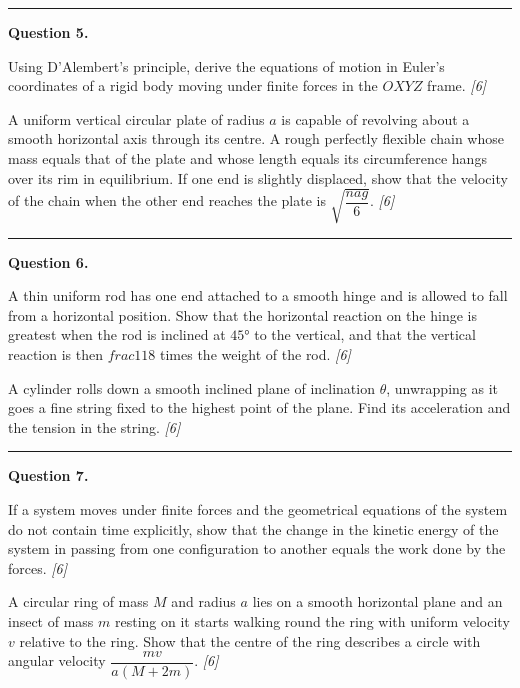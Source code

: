 \documentclass[11pt,a4paper]{article}
\newcommand{\pts}[1]{\hfill   \textit{[#1]}}
\begin{document}
\medskip\rule{\linewidth}{0.2pt}

\medskip


\noindent   \textbf{Question 5.}

\begin{parts}
  \item Using D'Alembert's principle, derive the equations of motion in Euler's coordinates of a rigid body moving under finite forces in the $OXYZ$ frame. \pts{6}
  \item A uniform vertical circular plate of radius $a$ is capable of revolving about a smooth horizontal axis through its centre. A rough perfectly flexible chain whose mass equals that of the plate and whose length equals its circumference hangs over its rim in equilibrium. If one end is slightly displaced, show that the velocity of the chain when the other end reaches the plate is $\sqrt{\dfrac{nag}{6}}$. \pts{6}
\end{parts}

\medskip\rule{\linewidth}{0.2pt}

\medskip


\noindent   \textbf{Question 6.}

\begin{parts}
  \item A thin uniform rod has one end attached to a smooth hinge and is allowed to fall from a horizontal position. Show that the horizontal reaction on the hinge is greatest when the rod is inclined at $45°$ to the vertical, and that the vertical reaction is then $ frac{11}{8}$ times the weight of the rod. \pts{6}
  \item A cylinder rolls down a smooth inclined plane of inclination $ \theta$, unwrapping as it goes a fine string fixed to the highest point of the plane. Find its acceleration and the tension in the string. \pts{6}
\end{parts}

\medskip\rule{\linewidth}{0.2pt}

\medskip


\noindent   \textbf{Question 7.}

\begin{parts}
  \item If a system moves under finite forces and the geometrical equations of the system do not contain time explicitly, show that the change in the kinetic energy of the system in passing from one configuration to another equals the work done by the forces. \pts{6}
  \item A circular ring of mass $M$ and radius $a$ lies on a smooth horizontal plane and an insect of mass $m$ resting on it starts walking round the ring with uniform velocity $v$ relative to the ring. Show that the centre of the ring describes a circle with angular velocity $\dfrac{mv}{a(M+2m)}$. \pts{6}
\end{parts}
\end{document}
